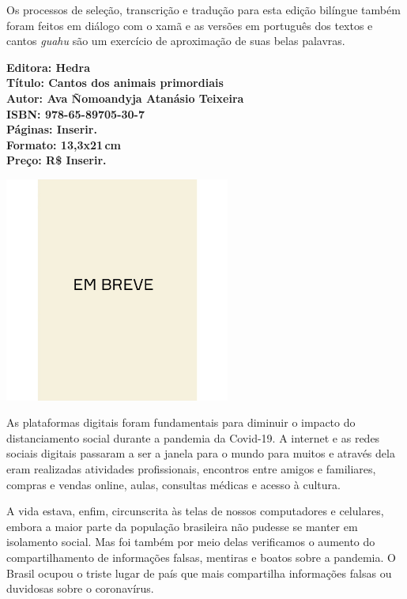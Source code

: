 Os processos de seleção, transcrição e tradução para esta edição bilíngue também foram feitos em diálogo com o xamã e as versões em português dos textos e cantos \textit{guahu} são um exercício de aproximação de suas belas palavras.

\vfill
\noindent\begin{minipage}[c]{1\linewidth}
{\small\textbf{
\hspace*{-.1cm}Editora: Hedra\\
Título: Cantos dos animais primordiais\\
Autor: Ava Ñomoandyja Atanásio Teixeira\\ 
ISBN: 978-65-89705-30-7\\
Páginas: Inserir.\\
Formato: 13,3x21\,cm\\
Preço: R\$ Inserir.\\
}}
\end{minipage}
\pagebreak

\begin{center}
\hspace*{.5cm}\includegraphics[width=74mm]{./CAPAS/breve.jpeg}
\end{center}
\hspace*{-7cm}\hrulefill\hspace*{-7cm}
\medskip

\noindent{}As plataformas digitais foram fundamentais para diminuir o impacto do distanciamento social durante a pandemia da Covid-19. A internet e as redes sociais digitais passaram a ser a janela para o mundo para muitos e através dela eram realizadas atividades profissionais, encontros entre amigos e familiares, compras e vendas online, aulas, consultas médicas e acesso à cultura. 

A vida estava, enfim, circunscrita às telas de nossos computadores e celulares, embora a maior parte da população brasileira não pudesse se manter em isolamento social. Mas foi também por meio delas verificamos o aumento do compartilhamento de informações falsas, mentiras e boatos sobre a pandemia. O Brasil ocupou o triste lugar de país que mais compartilha informações falsas ou duvidosas sobre o coronavírus.


